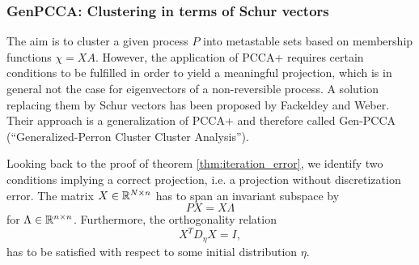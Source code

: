 \subsubsection*{GenPCCA: Clustering in terms of Schur vectors}

The aim is to cluster a given process $P$ into metastable sets based on membership functions $\chi = XA$.
However, the application of PCCA+ requires certain conditions to be fulfilled in order to yield a meaningful projection, which is in general not the case for eigenvectors of a non-reversible process.
A solution replacing them by Schur vectors has been proposed by Fackeldey and Weber\cite{fackeldey2017gen}. Their approach is a generalization of PCCA+ and therefore called Gen-PCCA (``Generalized-Perron Cluster Cluster Analysis'').


Looking back to the proof of theorem \ref{thm:iteration_error}, we identify two conditions implying a correct projection, i.e. a projection without discretization error.
The matrix $X \in \mathbb{R}^{N \times n}$ has to span an invariant subspace by
\begin{equation}
\label{eq:invariant}
PX = X\Lambda
\end{equation}
for $\Lambda \in \mathbb{R}^{n \times n}$. Furthermore, the orthogonality relation 
\begin{equation}
\label{eq:orthogonal}
X^T D_\eta X = I,
\end{equation}
has to be satisfied with respect to some initial distribution $\eta$.
\\

